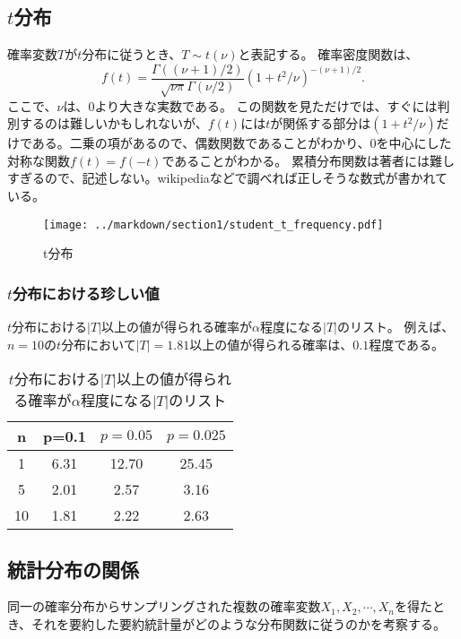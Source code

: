 \documentclass[a4paper,11pt,dvipdfmx]{jsarticle}
\begin{document}
\subsection{$t$分布}
確率変数$T$が$t$分布に従うとき、$T \sim t(\nu)$と表記する。
確率密度関数は、
\begin{equation*}
    f(t) = \frac{\Gamma((\nu+1)/2)}{\sqrt{\nu \pi}\Gamma(\nu/2) }(1+t^2/\nu)^{-(\nu+1)/2}.
\end{equation*}
ここで、$\nu$は、$0$より大きな実数である。
この関数を見ただけでは、すぐには判別するのは難しいかもしれないが、$f(t)$には$t$が関係する部分は$(1+t^2/\nu)$だけである。二乗の項があるので、偶数関数であることがわかり、$0$を中心にした対称な関数$f(t)=f(-t)$であることがわかる。
累積分布関数は著者には難しすぎるので、記述しない。wikipediaなどで調べれば正しそうな数式が書かれている。



\begin{figure}
    \begin{center}
        \texttt{[image: ../markdown/section1/student\_t\_frequency.pdf]}
        \caption{t分布}
        \label{student_t}
    \end{center}
\end{figure}

\subsubsection{$t$分布における珍しい値}
$t$分布における$|T|$以上の値が得られる確率が$\alpha$程度になる$|T|$のリスト。
例えば、$n=10$の$t$分布において$|T|=1.81$以上の値が得られる確率は、$0.1$程度である。


\begin{table}[hbtp]
    \caption{$t$分布における$|T|$以上の値が得られる確率が$\alpha$程度になる$|T|$のリスト}
    \label{table:student_t_confidence}
    \centering
    \begin{tabular}{cccc}
    n & p=0.1 & $p=0.05$ & $p=0.025$   \\
    \hline \hline
    1 & 6.31 & 12.70 & 25.45 \\
    5 & 2.01 &2.57  & 3.16\\
    10 & 1.81 &  2.22& 2.63 \\
      \hline
    \end{tabular}
  \end{table}


\subsection{統計分布の関係}
同一の確率分布からサンプリングされた複数の確率変数$X_1,X_2,\cdots,X_n$を得たとき、それを要約した要約統計量がどのような分布関数に従うのかを考察する。
\end{document}
